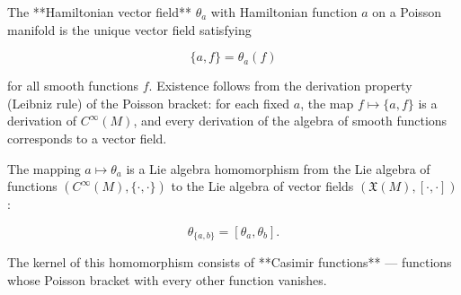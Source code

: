 The **Hamiltonian vector field** $\theta_a$ with Hamiltonian function $a$ on a Poisson manifold is the unique vector field satisfying

$$\{a, f\} = \theta_a(f)$$

for all smooth functions $f$. Existence follows from the derivation property (Leibniz rule) of the Poisson bracket: for each fixed $a$, the map $f \mapsto \{a, f\}$ is a derivation of $C^\infty(M)$, and every derivation of the algebra of smooth functions corresponds to a vector field.

The mapping $a \mapsto \theta_a$ is a Lie algebra homomorphism from the Lie algebra of functions $(C^\infty(M), \{\cdot, \cdot\})$ to the Lie algebra of vector fields $(\mathfrak{X}(M), [\cdot, \cdot])$:

$$\theta_{\{a, b\}} = [\theta_a, \theta_b].$$

The kernel of this homomorphism consists of **Casimir functions** — functions whose Poisson bracket with every other function vanishes.
